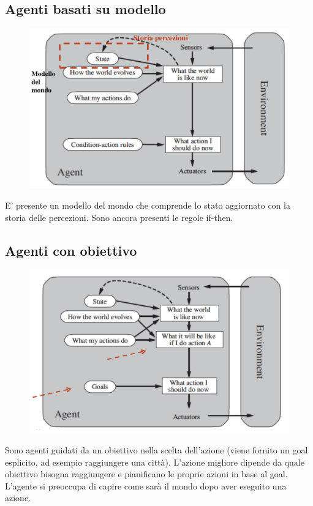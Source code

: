 \documentclass{article}
\begin{document}
\subsection{Agenti basati su modello}
\begin{figure}[H]
    \centering
    \includegraphics[scale=0.4]{Images/agentibasatisumodello.png}
\end{figure}
E' presente un modello del mondo che comprende lo stato aggiornato con la storia delle percezioni. Sono ancora presenti le regole if-then.

\subsection{Agenti con obiettivo}
\begin{figure}[H]
    \centering
    \includegraphics[scale=0.4]{Images/agenticonobiettivo.png}
\end{figure}
Sono agenti guidati da un obiettivo nella scelta dell'azione (viene fornito un goal esplicito, ad esempio raggiungere una città). L'azione migliore dipende da quale obiettivo bisogna raggiungere e pianificano le proprie azioni in base al goal. L'agente si preoccupa di capire come sarà il mondo dopo aver eseguito una azione.
\end{document}
